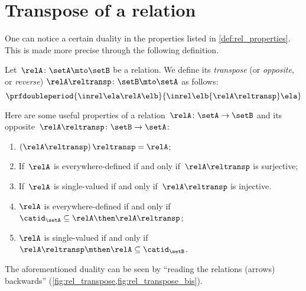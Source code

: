 \section{Transpose of a relation}

One can notice a certain duality in the properties listed in \cref{def:rel_properties}.
This is made more precise through the following definition.

\begin{ctdefinition}
    \label{def:relation-transpose}
    Let~$\relA\colon \setA\mto \setB$ be a relation.
    We define its \emph{transpose} (or \emph{opposite}, or \emph{reverse}) $\relA\reltransp\colon \setB \mto \setA$ as follows:
    \begin{equation*}
        \prfdoubleperiod{
            \inrel \ela \relA \elb
        }{
            \inrel \elb {\relA\reltransp} \ela
        }
    \end{equation*}
\end{ctdefinition}
\begin{remark}
    \label{re:rel-op-properties}
    Here are some useful properties of a relation~$\relA\colon \setA\to \setB$  and its opposite~$\relA\reltransp\colon \setB\to \setA$:
    \begin{enumerate}
        \item $\left(\relA\reltransp\right)\reltransp = \relA $;
        \item If~$\relA$ is everywhere-defined if and only if~$\relA\reltransp$ is surjective;
        \item If~$\relA$ is single-valued if and only if~$\relA\reltransp$ is injective.
        \item $\relA$ is everywhere-defined if and only if~$\catid_\setA\subseteq \relA \then \relA\reltransp$;
        \item $\relA$ is single-valued if and only if~$\relA\reltransp\mthen \relA\subseteq \catid_\setB$.
    \end{enumerate}
\end{remark}

\begin{remark}
    The aforementioned duality can be seen by ``reading the relations (arrows) backwards'' (\cref{fig:rel_transpose,fig:rel_transpose_bis}).
\end{remark}

